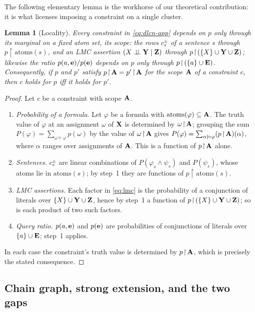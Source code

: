 \documentclass{article} %
\newtheorem{lemma}{Lemma}
\newcommand{\indep}{\perp\!\!\!\perp}
\newcommand{\atoms}{\mathrm{atoms}}
\newcommand{\restr}{\!\restriction\!}
\begin{document}
The following elementary lemma is the workhorse of our theoretical contribution: it
is what licenses imposing a constraint on a single cluster.

\begin{lemma}[Locality]\label{lem:locality}
Every constraint in \eqref{eq:dlcn-app} depends on $p$ only through its marginal on a
fixed atom set, its \emph{scope}: the rows $c^\pm_s$ of a sentence $s$ through
$p\restr\atoms(s)$, and an LMC assertion $(X\indep\bY\mid\bZ)$ through
$p\restr(\{X\}\cup\bY\cup\bZ)$; likewise the ratio $p(a,\mathbf{e})/p(\mathbf{e})$ depends on
$p$ only through $p\restr(\{a\}\cup\bE)$. Consequently, if $p$ and $p'$ satisfy
$p\restr\bA=p'\restr\bA$ for the scope $\mathbf{A}$ of a constraint $c$, then $c$ holds
for $p$ iff it holds for $p'$.
\end{lemma}

\begin{proof}
Let $c$ be a constraint with scope $\mathbf{A}$.
\begin{enumerate}
  \item \emph{Probability of a formula.} Let $\varphi$ be a formula with
  $\atoms(\varphi)\subseteq\bA$. The truth value of $\varphi$ at an assignment
  $\omega$ of $\mathbf{X}$ is determined by $\omega\restr\bA$; grouping the sum
  $P(\varphi)=\sum_{\omega\models\varphi}p(\omega)$ by the value of
  $\omega\restr\bA$ gives $P(\varphi)=\sum_{\alpha\models\varphi}(p\restr\bA)(\alpha)$,
  where $\alpha$ ranges over assignments of $\mathbf{A}$. This is a function of
  $p\restr\bA$ alone.
  \item \emph{Sentences.} $c^\pm_s$ are linear combinations of $P(\varphi_s\wedge\psi_s)$
  and $P(\psi_s)$, whose atoms lie in $\atoms(s)$; by step~1 they are functions
  of $p\restr\atoms(s)$.
  \item \emph{LMC assertions.} Each factor in \eqref{eq:lmc} is the probability
  of a conjunction of literals over $\{X\}\cup\mathbf{Y}\cup\mathbf{Z}$, hence by step~1 a
  function of $p\restr(\{X\}\cup\bY\cup\bZ)$; so is each product of two such
  factors.
  \item \emph{Query ratio.} $p(a,\mathbf{e})$ and $p(\mathbf{e})$ are probabilities of
  conjunctions of literals over $\{a\}\cup\mathbf{E}$; step~1 applies.
\end{enumerate}
In each case the constraint's truth value is determined by $p\restr\bA$, which is
precisely the stated consequence.
\end{proof}

\subsection{Chain graph, strong extension, and the two gaps}\label{sec:prelim-gaps}
\end{document}
